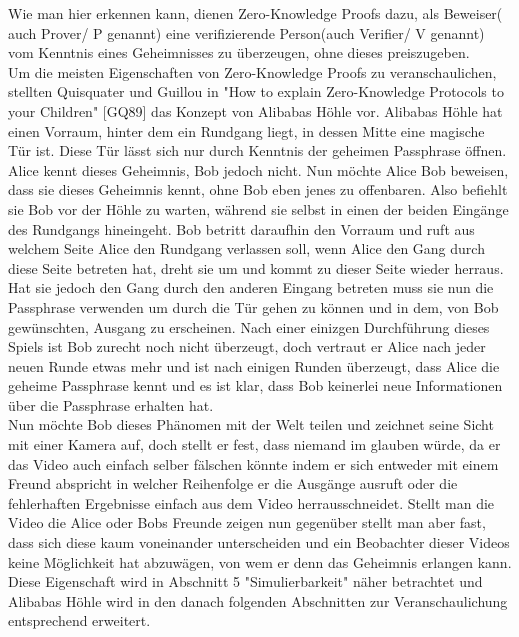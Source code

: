 \documentclass {article}
\begin{document}
Wie man hier erkennen kann, dienen Zero-Knowledge Proofs dazu, als Beweiser( auch Prover/ P genannt) eine
verifizierende Person(auch Verifier/ V genannt) vom Kenntnis eines Geheimnisses zu überzeugen, ohne dieses preiszugeben. \\ 

Um die meisten Eigenschaften von Zero-Knowledge Proofs zu veranschaulichen, stellten Quisquater und Guillou in "How to explain Zero-Knowledge Protocols to your Children" [GQ89] das Konzept von Alibabas H\"ohle vor. Alibabas H\"ohle hat einen Vorraum, hinter dem ein Rundgang liegt, in dessen Mitte eine magische T\"ur ist. Diese T\"ur l\"asst sich nur durch Kenntnis der geheimen Passphrase \"offnen. Alice kennt dieses Geheimnis, Bob jedoch nicht. Nun m\"ochte Alice Bob beweisen, dass sie dieses Geheimnis kennt, ohne Bob eben jenes zu offenbaren. Also befiehlt sie Bob vor der H\"ohle zu warten, w\"ahrend sie selbst in einen der beiden Eing\"ange des Rundgangs hineingeht. Bob betritt daraufhin den Vorraum und ruft aus welchem Seite Alice den Rundgang verlassen soll, wenn Alice den Gang durch diese Seite betreten hat, dreht sie um und kommt zu dieser Seite wieder herraus. Hat sie jedoch den Gang durch den anderen Eingang betreten muss sie nun die Passphrase verwenden um durch die T\"ur gehen zu k\"onnen und in dem, von Bob gewünschten, Ausgang zu erscheinen. Nach einer einizgen Durchf\"uhrung dieses Spiels ist Bob zurecht noch nicht \"uberzeugt, doch vertraut er Alice nach jeder neuen Runde etwas mehr und ist nach einigen Runden \"uberzeugt, dass Alice die geheime Passphrase kennt und es ist klar, dass Bob keinerlei neue Informationen \"uber die Passphrase erhalten hat. \\  Nun m\"ochte Bob dieses Ph\"anomen mit der Welt teilen und zeichnet seine Sicht mit einer Kamera auf, doch stellt er fest, dass niemand im glauben würde, da er das Video auch einfach selber f\"alschen k\"onnte indem er sich entweder mit einem Freund abspricht in welcher Reihenfolge er die Ausg\"ange ausruft oder die fehlerhaften Ergebnisse einfach aus dem Video herrausschneidet. 
Stellt man die Video die Alice oder Bobs Freunde zeigen nun gegen\"uber stellt man aber fast, dass sich diese kaum voneinander unterscheiden und ein Beobachter dieser Videos keine M\"oglichkeit hat abzuw\"agen, von wem er denn das Geheimnis erlangen kann.
Diese Eigenschaft wird in Abschnitt 5 "Simulierbarkeit" n\"aher betrachtet und Alibabas H\"ohle wird in den danach folgenden Abschnitten zur Veranschaulichung entsprechend erweitert.
\end{document}
